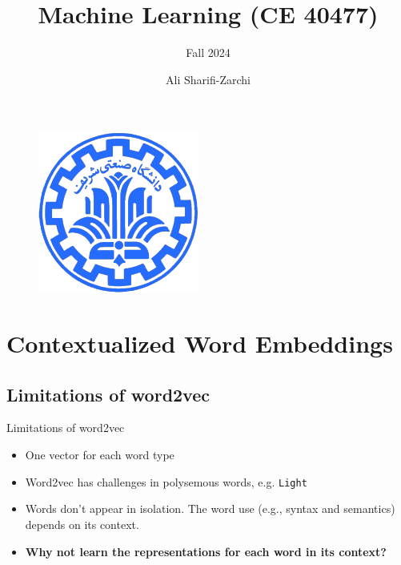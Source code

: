 \documentclass[serif, aspectratio=169]{beamer}
\author{Ali Sharifi-Zarchi}
\title{Machine Learning (CE 40477)}
\subtitle{Fall 2024}
\institute{
    CE Department \\
    Sharif University of Technology
}
\begin{document}
\begin{frame}
    \titlepage
    \vspace*{-0.6cm}
    \begin{figure}[htpb]
        \begin{center}
            \includegraphics[keepaspectratio, scale=0.25]{pic/sharif-main-logo.png}
        \end{center}
    \end{figure}
\end{frame}

\begin{frame}    
\tableofcontents[sectionstyle=show,
subsectionstyle=show/shaded/hide,
subsubsectionstyle=show/shaded/hide]
\end{frame}

\section{Contextualized Word Embeddings}

\subsection{Limitations of word2vec}

\begin{frame}{Limitations of word2vec}
    \begin{itemize} 
    
        \item One vector for each word type
        
        \item Word2vec has challenges in polysemous words, e.g. \texttt{Light}
        \item Words don’t appear in isolation. The word use (e.g., syntax and semantics) depends on its context.
        
        \item \textbf{Why not learn the representations for each word in its context?}

        \end{itemize}
\end{frame}
\end{document}
